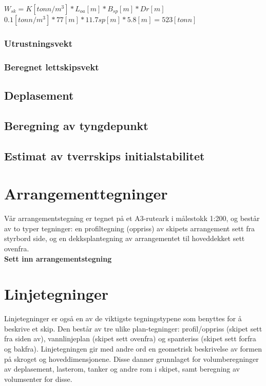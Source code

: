 \documentclass[norsk]{article}
\begin{document}
$W_{sk} = K[tonn/m^3] * L_{oa}[m] * B_{sp}[m] * Dr[m]$\\

$0.1 [tonn/m^3] * 77[m] * 11.7{sp}[m] * 5.8[m] = 523[tonn]$\\
  		  
  		\subsubsection{Utrustningsvekt}
  		\subsubsection{Beregnet lettskipsvekt}
  	\subsection{Deplasement}
  	\subsection{Beregning av tyngdepunkt}
  	\subsection{Estimat av tverrskips initialstabilitet}

\section{Arrangementtegninger}
Vår arrangementstegning er tegnet på et A3-ruteark i målestokk 1:200, og består av to typer tegninger: en profiltegning (oppriss) av skipets arrangement sett fra styrbord side, og en dekksplantegning av arrangementet til hoveddekket sett ovenfra. \\

\textbf{Sett inn arrangementstegning} \\

\section{Linjetegninger}
Linjetegninger er også en av de viktigste tegningstypene som benyttes for å beskrive et skip. Den består av tre ulike plan-tegninger: profil/oppriss (skipet sett fra siden av), vannlinjeplan (skipet sett ovenfra) og spanteriss (skipet sett forfra og bakfra). Linjetegningen gir med andre ord en geometrisk beskrivelse av formen på skroget og hoveddimensjonene. Disse danner grunnlaget for volumberegninger av deplasement, lasterom, tanker og andre rom i skipet, samt beregning av volumsenter for disse. \\
\end{document}
